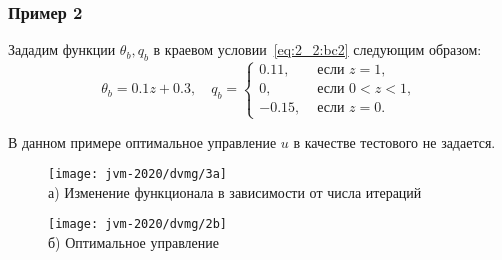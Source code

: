 \begin{frame}
    \frametitle{Пример 2}
    Зададим функции $\theta_{b}, q_{b}$ в краевом условии~\eqref{eq:2_2:bc2}
    следующим образом:
    \[
        \theta_{b}=0.1 z+0.3, \quad q_{b}=
        \begin{cases}
            0.11, & \text { если } z=1, \\
            0, & \text { если } 0<z<1, \\
            -0.15, & \text { если } z=0.
        \end{cases}
    \]

    В данном примере оптимальное управление $u$ в качестве тестового не задается.

    \begin{figure}[h!t]
        \begin{minipage}[b][][b]{0.49\linewidth}
            \centering
            \texttt{[image: jvm-2020/dvmg/3a]}
            \\ а) Изменение функционала в зависимости от числа итераций
        \end{minipage}
        \hfill
        \begin{minipage}[b][][b]{0.49\linewidth}
            \centering
            \texttt{[image: jvm-2020/dvmg/2b]}
            \\ б) Оптимальное управление
        \end{minipage}
        \label{fig:4_4:3}
    \end{figure}

\end{frame}
